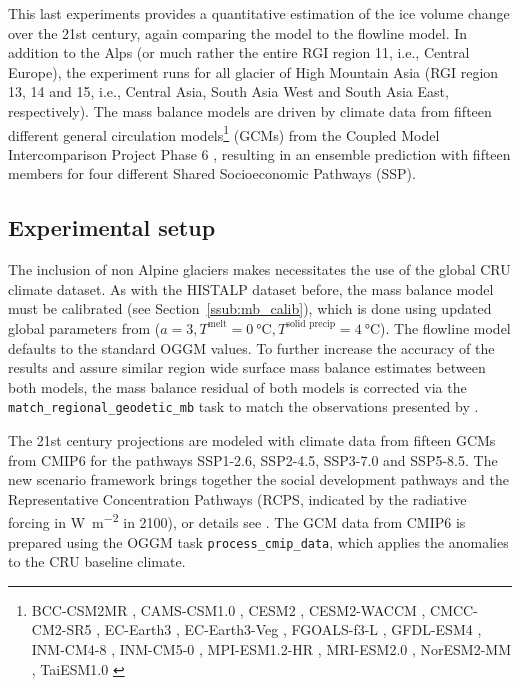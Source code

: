     This last experiments provides a quantitative estimation of the ice volume change over the 21st century, again comparing the \vas{} model to the flowline model. In addition to the Alps (or much rather the entire RGI region 11, i.e., Central Europe), the experiment runs for all glacier of High Mountain Asia (RGI region 13, 14 and 15, i.e., Central Asia, South Asia West and South Asia East, respectively). The mass balance models are driven by climate data from fifteen different general circulation models\footnote{ BCC-CSM2MR \citep{CMIP6-BCC-CSM2MR}, CAMS-CSM1.0 \citep{CMIP6-CAMS-CSM1.0}, CESM2 \citep{CMIP6-CESM2}, CESM2-WACCM \citep{CMIP6-CESM2-WACCM}, CMCC-CM2-SR5 \citep{CMIP6-CMCC-CM2-SR5}, EC-Earth3 \citep{CMIP6-EC-Earth3}, EC-Earth3-Veg \citep{CMIP6-EC-Earth3-Veg}, FGOALS-f3-L \citep{CMIP6-FGOALS-f3-L}, GFDL-ESM4 \citep{CMIP6-GFDL-ESM4}, INM-CM4-8 \citep{CMIP6-INM-CM4-8}, INM-CM5-0 \citep{CMIP6-INM-CM5-0}, MPI-ESM1.2-HR \citep{CMIP6-MPI-ESM1.2-HR-DKRZ, CMIP6-MPI-ESM1.2-HR-DWD}, MRI-ESM2.0 \citep{CMIP6-MRI-ESM2.0}, NorESM2-MM \citep{CMIP6-NorESM2-MM}, TaiESM1.0 \citep{CMIP6-TaiESM1.0}} (GCMs) from the Coupled Model Intercomparison Project Phase 6 \citep[CMIP6, ][]{Eyring2016_CMIP}, resulting in an ensemble prediction with fifteen members for four different Shared Socioeconomic Pathways (SSP).

    \subsection{Experimental setup} %
    \label{sub:experimental_setup_projections}

      The inclusion of non Alpine glaciers makes necessitates the use of the global CRU climate dataset. As with the HISTALP dataset before, the \vas{} mass balance model must be calibrated (see Section~\ref{ssub:mb_calib}), which is done using updated global parameters from \citet{Malles2020} ($a = 3, T^\text{melt} = \SI{0}{\celsius}, T^\text{solid precip} = \SI{4}{\celsius}$). The flowline model defaults to the standard OGGM values. To further increase the accuracy of the results and assure similar region wide surface mass balance estimates between both models, the mass balance residual \bias{} of both models is corrected via the \lstinline`match_regional_geodetic_mb` task to match the observations presented by \citet{Hugonnet2020}. 

      The 21st century projections are modeled with climate data from fifteen GCMs from CMIP6 for the pathways SSP1-2.6, SSP2-4.5, SSP3-7.0 and SSP5-8.5. The new scenario framework brings together the social development pathways and the Representative Concentration Pathways (RCPS, indicated by the radiative forcing in \si{\watt\per\square\meter} in 2100), or details see \citet{ONeill2016, Riahi2017}.  The GCM data from CMIP6 is prepared using the OGGM task \lstinline`process_cmip_data`, which applies the anomalies to the CRU baseline climate.
      
